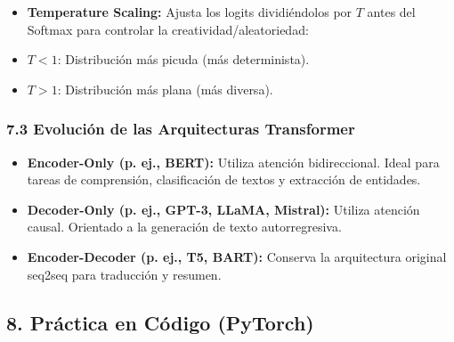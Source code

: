 \documentclass[11pt,oneside]{article}
\begin{document}
\begin{itemize}

\item \textbf{Temperature Scaling:} Ajusta los logits dividiéndolos por \(T\) antes del Softmax para controlar la creatividad/aleatoriedad:

\end{itemize}

\begin{itemize}

\item \(T < 1\): Distribución más picuda (más determinista).

\end{itemize}

\begin{itemize}

\item \(T > 1\): Distribución más plana (más diversa).

\end{itemize}

\subsubsection{7.3 Evolución de las Arquitecturas Transformer}

\begin{itemize}

\item \textbf{Encoder-Only (p. ej., BERT):} Utiliza atención bidireccional. Ideal para tareas de comprensión, clasificación de textos y extracción de entidades.

\end{itemize}

\begin{itemize}

\item \textbf{Decoder-Only (p. ej., GPT-3, LLaMA, Mistral):} Utiliza atención causal. Orientado a la generación de texto autorregresiva.

\end{itemize}

\begin{itemize}

\item \textbf{Encoder-Decoder (p. ej., T5, BART):} Conserva la arquitectura original seq2seq para traducción y resumen.

\end{itemize}

\subsection{8. Práctica en Código (PyTorch)}
\end{document}
